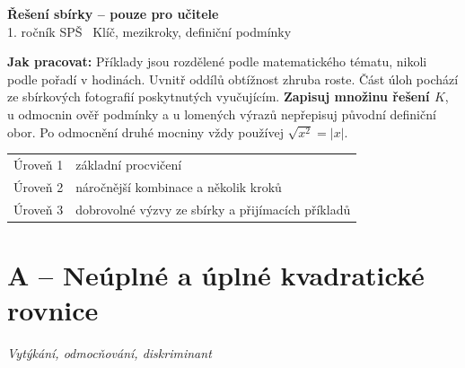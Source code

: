 \documentclass[11pt,a4paper]{article}
\begin{document}
\begin{center}
{\LARGE\bfseries Řešení sbírky -- pouze pro učitele}\\[2mm]
{\normalsize 1. ročník SPŠ \textbar\ Klíč, mezikroky, definiční podmínky}\\[3mm]
\end{center}
\textbf{Jak pracovat:} Příklady jsou rozdělené podle matematického tématu, nikoli podle pořadí v hodinách.
Uvnitř oddílů obtížnost zhruba roste. Část úloh pochází ze sbírkových fotografií poskytnutých vyučujícím.
\textbf{Zapisuj množinu řešení $K$}, u odmocnin ověř podmínky a u lomených výrazů nepřepisuj původní definiční obor.
Po odmocnění druhé mocniny vždy používej $\sqrt{x^2}=|x|$.
\begin{center}\small
\begin{tabular}{@{}ll@{}}\toprule
Úroveň 1 & základní procvičení\\
Úroveň 2 & náročnější kombinace a několik kroků\\
Úroveň 3 & dobrovolné výzvy ze sbírky a přijímacích příkladů\\
\bottomrule\end{tabular}
\end{center}
\section*{A -- Neúplné a úplné kvadratické rovnice}
\textit{Vytýkání, odmocňování, diskriminant}
\end{document}
